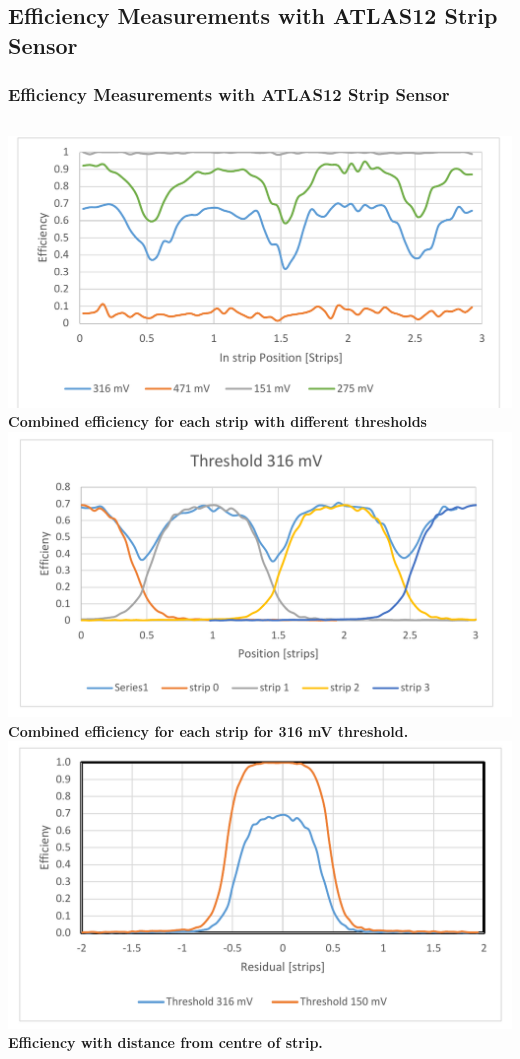 \documentclass{beamer}
\begin{document}
\subsection{Efficiency Measurements with ATLAS12 Strip Sensor}
\begin{frame}
\frametitle{Efficiency Measurements with ATLAS12 Strip Sensor}
\begin{columns}[t]
\centering
\includegraphics[width=0.9\linewidth]{pics/may2015Testbeam_cropped.pdf}\\
\tiny{\textbf{Combined efficiency for each strip with different thresholds}}\\
\includegraphics[width=0.9\linewidth]{pics/eff_strip.pdf}\\
\tiny{\textbf{Combined efficiency for each strip for 316 mV  threshold. }}\\
\centering
\includegraphics[width=0.9\linewidth]{pics/eff_strip_single_cropped.pdf}\\ 
\tiny{\textbf{Efficiency with distance from centre of strip.}}


\end{columns}
\end{frame}
\end{document}
